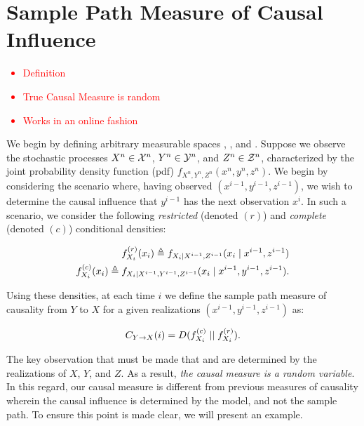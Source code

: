 \section{Sample Path Measure of Causal Influence}

\textcolor{red}
{\begin{itemize}
    \item Definition
    \item True Causal Measure is random
    \item Works in an online fashion
\end{itemize}}

We begin by defining arbitrary measurable spaces , , and . Suppose we observe the stochastic processes $X^n \in \mathcal{X}^n$, $Y^n \in \mathcal{Y}^n$, and $Z^n \in \mathcal{Z}^n$, characterized by the joint probability density function (pdf) $f_{X^n,Y^n,Z^n}(x^n,y^n,z^n)$. We begin by considering the scenario where, having observed $(x^{i-1},y^{i-1},z^{i-1})$, we wish to determine the causal influence that $y^{i-1}$ has the next observation $x^i$. In such a scenario, we consider the following \emph{restricted} (denoted $(r)$) and \emph{complete} (denoted $(c)$) conditional densities:

\begin{eqnarray}
f_{X_i}^{(r)}(x_i) \triangleq f_{X_i \mid X^{i-1},Z^{i-1}}
    (x_i \mid x^{i-1},z^{i-1}) \\
f_{X_i}^{(c)}(x_i) \triangleq f_{X_i \mid X^{i-1},Y^{i-1},Z^{i-1}}
    (x_i \mid x^{i-1},y^{i-1},z^{i-1}).
\end{eqnarray}

\noindent Using these densities, at each time $i$ we define the sample path measure of causality from $Y$ to $X$ for a given  realizations $(x^{i-1},y^{i-1},z^{i-1})$ as:

\begin{equation}
C_{Y\rightarrow X}(i) = D(f_{X_i}^{(c)} \mid \mid f_{X_i}^{(r)}).
\end{equation}

The key observation that must be made that  and  are determined by the realizations of $X$, $Y$, and $Z$. As a result, \emph{the causal measure is a random variable}. In this regard, our causal measure is different from previous measures of causality wherein the causal influence is determined by the model, and not the sample path. To ensure this point is made clear, we will present an example.


